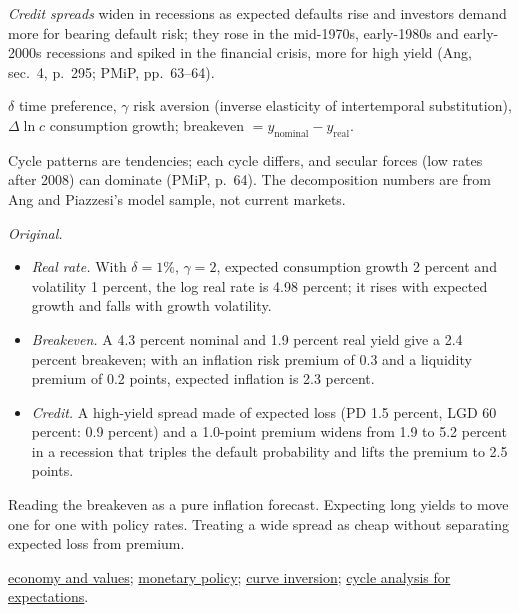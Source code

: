 \begin{qfmethod}
\emph{Credit spreads} widen in recessions as expected defaults rise and investors demand more for bearing default risk; they rose in the mid-1970s, early-1980s and early-2000s recessions and spiked in the financial crisis, more for high yield (Ang, sec.~4, p.~295; PMiP, pp.~63--64).

 $\delta$ time preference, $\gamma$ risk aversion (inverse elasticity of intertemporal substitution), $\Delta\ln c$ consumption growth; breakeven $=y_{\text{nominal}}-y_{\text{real}}$.

 Cycle patterns are tendencies; each cycle differs, and secular forces (low rates after 2008) can dominate (PMiP, p.~64). The decomposition numbers are from Ang and Piazzesi's model sample, not current markets.

 \emph{Original.}
\begin{itemize}
\item \emph{Real rate.} With $\delta=1\%$, $\gamma=2$, expected consumption growth 2 percent and volatility 1 percent, the log real rate is 4.98 percent; it rises with expected growth and falls with growth volatility.
\item \emph{Breakeven.} A 4.3 percent nominal and 1.9 percent real yield give a 2.4 percent breakeven; with an inflation risk premium of 0.3 and a liquidity premium of 0.2 points, expected inflation is 2.3 percent.
\item \emph{Credit.} A high-yield spread made of expected loss (PD 1.5 percent, LGD 60 percent: 0.9 percent) and a 1.0-point premium widens from 1.9 to 5.2 percent in a recession that triples the default probability and lifts the premium to 2.5 points.
\end{itemize}

 Reading the breakeven as a pure inflation forecast. Expecting long yields to move one for one with policy rates. Treating a wide spread as cheap without separating expected loss from premium.

 \hyperref[res:economy-discount-rates-cash-flows]{economy and values}; \hyperref[def:monetary-policy-transmission-regimes]{monetary policy}; \hyperref[meth:curve-trades-carry-rolldown]{curve inversion}; \hyperref[meth:cycle-policy-curve-expectations]{cycle analysis for expectations}.

\end{qfmethod}

